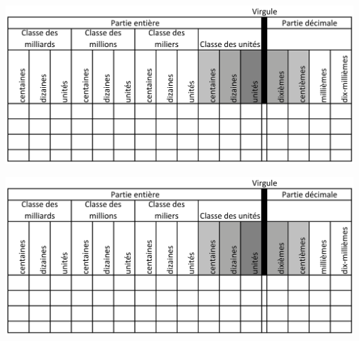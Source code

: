 \documentclass[12pt,a4paper]{article}
\begin{document}
\vspace*{0.5cm}
\begin{center}
	\includegraphics[scale=0.3]{img/tab_rangs}
\end{center}

\vspace*{0.5cm}

\begin{center}
	\includegraphics[scale=0.3]{img/tab_rangs}
\end{center}





	
\end{document}
